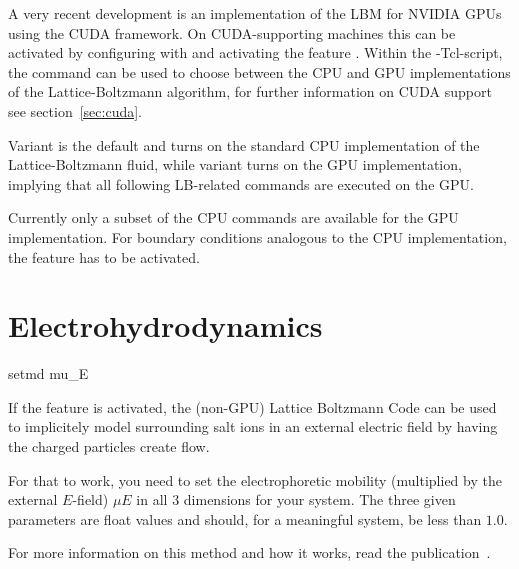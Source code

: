 A very recent development is an implementation of the LBM for NVIDIA
GPUs using the CUDA framework.  On CUDA-supporting machines this can
be activated by configuring with  and activating the feature .
Within the \es-Tcl-script, the  command can be used to
choose between the CPU and GPU implementations of the
Lattice-Boltzmann algorithm, for further information on CUDA support
see section~\ref{sec:cuda}.

Variant  is the default and turns on the standard CPU
implementation of the Lattice-Boltzmann fluid, while variant
 turns on the GPU implementation, implying that all
following LB-related commands are executed on the GPU.

Currently only a subset of the CPU commands are available for the GPU
implementation.  For boundary conditions analogous to the CPU
implementation, the feature  has to be
activated.


\section{Electrohydrodynamics}

\begin{essyntax}
  setmd mu_E   
  \begin{features}
  \end{features}
\end{essyntax}

If the feature  is activated, the
(non-GPU) Lattice Boltzmann Code can be used to implicitely model
surrounding salt ions in an external electric field by having the
charged particles create flow.

For that to work, you need to set the electrophoretic mobility
(multiplied by the external $E$-field) $\mu E$ in all 3 dimensions for
your system. The three given parameters are float values and should,
for a meaningful system, be less than $1.0$.

For more information on this method and how it works, read the
publication~\cite{hickey10a}.

